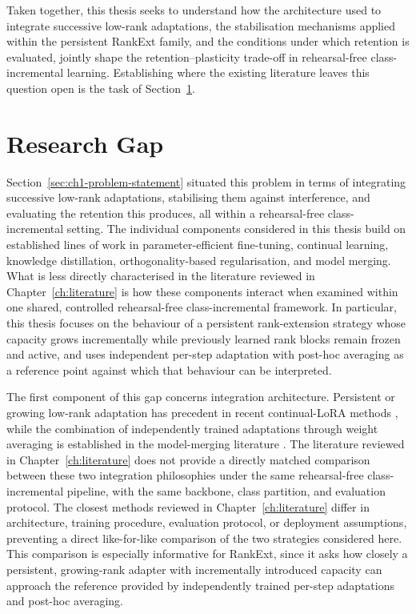 Taken together, this thesis seeks to understand how the architecture used
to integrate successive low-rank adaptations, the stabilisation mechanisms
applied within the persistent RankExt family, and the conditions under
which retention is evaluated, jointly shape the retention--plasticity trade-off in
rehearsal-free class-incremental learning. Establishing where the existing
literature leaves this question open is the task of
Section~\ref{sec:ch1-research-gap}.

\section{Research Gap}
\label{sec:ch1-research-gap}

Section~\ref{sec:ch1-problem-statement} situated this problem in terms of
integrating successive low-rank adaptations, stabilising them against
interference, and evaluating the retention this produces, all within a
rehearsal-free class-incremental setting. The individual components
considered in this thesis build on established lines of work in
parameter-efficient fine-tuning, continual learning, knowledge
distillation, orthogonality-based regularisation, and model merging. What
is less directly characterised in the literature reviewed in
Chapter~\ref{ch:literature} is how these components interact when examined
within one shared, controlled rehearsal-free class-incremental framework.
In particular, this thesis focuses on the behaviour of a persistent
rank-extension strategy whose capacity grows incrementally while previously
learned rank blocks remain frozen and active, and uses independent per-step
adaptation with post-hoc averaging as a reference point against which that
behaviour can be interpreted.

The first component of this gap concerns integration architecture.
Persistent or growing low-rank adaptation has precedent in recent
continual-LoRA methods \parencite{wu2025sdlora,he2025cllora}, while the
combination of independently trained adaptations through weight averaging
is established in the model-merging literature
\parencite{wortsman2022model}. The literature reviewed in
Chapter~\ref{ch:literature} does not provide a directly matched comparison
between these two integration philosophies under the same rehearsal-free
class-incremental pipeline, with the same backbone, class partition, and
evaluation protocol. The closest methods reviewed in
Chapter~\ref{ch:literature} differ in architecture, training procedure,
evaluation protocol, or deployment assumptions, preventing a direct
like-for-like comparison of the two strategies considered here. This
comparison is especially informative for RankExt, since it asks how
closely a persistent, growing-rank adapter with incrementally introduced
capacity can approach the reference provided by independently trained
per-step adaptations and post-hoc averaging.


